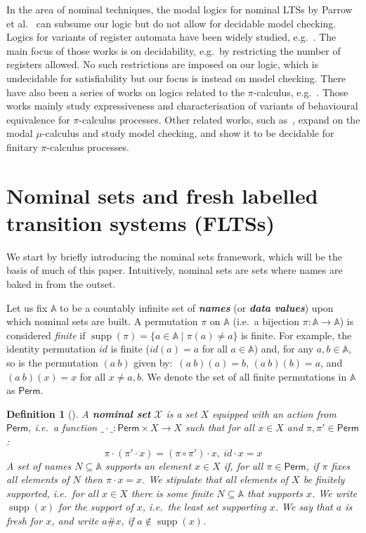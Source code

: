 \documentclass[10pt,a4paper]{article}
\newtheorem{definition}[theorem]{Definition}
\theoremstyle{definition}
\theoremstyle{remark}
\newcommand\boldemph[1]{\emph{\textbf{#1}}}
\DeclareMathOperator{\supp}{supp}
\newcommand\Xcal{\mathcal{X}}
\newcommand\Atoms{\mathbb{A}}
\renewcommand\S{N}
\newcommand{\swp}[2]{(#1\ #2)}
\newcommand\Perm[0]{{\mathsf{Perm}}}
\begin{document}
In the area of nominal techniques, the modal logics for nominal LTSs by Parrow et al.~\cite{NomLogics} can subsume our logic but do not allow for decidable model checking.
Logics for variants of register automata have been widely studied, e.g.~\cite{DBLP:conf/csl/Segoufin06,DBLP:journals/tocl/DemriL09,DBLP:conf/mfcs/FigueiraS09}.
The main focus of those works is on decidability, e.g.\ by restricting the number of registers allowed. No such restrictions are imposed on our logic, which is undecidable for satisfiability but our focus is instead on model checking.
There have also been a series of works on logics related to the $\pi$-calculus, e.g.~\cite{DBLP:journals/mscs/NicolaL08,DBLP:journals/cl/KoutavasH12,DBLP:conf/icalp/BergerHY08}.
Those works mainly study expressiveness and characterisation of variants of behavioural equivalence for $\pi$-calculus processes. 
Other related works, such as~\cite{DBLP:journals/iandc/Dam96,BradfieldStevens99}, expand on the modal $\mu$-calculus and study model checking, and show it to be decidable for finitary $\pi$-calculus processes. 




\section{Nominal sets and fresh labelled transition systems (FLTSs)}

We start by briefly introducing the nominal sets framework, which will be the basis of much of this paper. Intuitively, nominal sets are sets where names are baked in from the outset.

Let us fix $\Atoms$ to be a countably infinite set of \boldemph{names} (or \boldemph{data values}) upon which nominal sets are built. 
    A permutation $\pi$ on $\Atoms$ (i.e.\ a bijection $\pi:\Atoms\to\Atoms$) is considered \emph{finite} if $\supp(\pi) = \{a \in \Atoms\mid \pi(a) \neq a\}$ is finite.
 For example, the identity permutation $id$ is finite ($id(a)=a$ for all $a\in\Atoms$) and, for any $a,b\in\Atoms$, so is the permutation $\swp{a}{b}$ given by:\ 
$\swp{a}{b}(a) = b$, $\swp{a}{b}(b) = a$, and $\swp{a}{b}(x) = x$ for all $x\neq a,b$.  
 We denote the set of all finite permutations in $\Atoms$ as $\Perm$.
                       
\begin{definition}[\cite{PittsGabbay,Pitts}]\label{def:nomset}
    A \boldemph{nominal set} $\Xcal$ is a set $X$ equipped with an action from $\Perm$, i.e.\ a function $\_ \cdot \_: \Perm \times X \rightarrow X$ such that for all $x \in X$ and  $\pi, \pi' \in \Perm$:
    \[
    \pi \cdot (\pi' \cdot x) = (\pi \circ \pi') \cdot x,\ id \cdot x = x
    \]
    A set of names $\S\subseteq \Atoms$ \emph{supports} an element $x \in X$ if, for all $\pi \in \Perm$, if $\pi$ fixes all elements of $\S$ then $\pi\cdot x=x$. We stipulate that all elements of $X$ be \emph{finitely supported}, i.e.\ for all $x\in X$ there is some finite $\S\subseteq\Atoms$ that supports $x$. We write $\supp(x)$ for \emph{the support of $x$}, i.e.\ the least set supporting $x$. We say that $a$ \emph{is fresh for $x$}, and write $a\# x$, if $a\notin\supp(x)$.
\end{definition}
\end{document}
